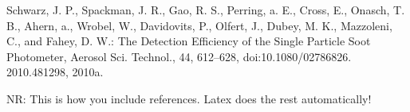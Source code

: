 \documentclass[11pt]{article}
\newcommand{\nrtodo}[1]{{\color{blue} NR: #1}}
\begin{document}
Schwarz, J. P., Spackman, J. R., Gao, R. S., Perring, a. E., Cross, E., Onasch, T. B., Ahern, a., Wrobel, W., Davidovits, P., Olfert, J., Dubey, M. K., Mazzoleni, C., and Fahey, D. W.: The Detection Efficiency of the Single Particle Soot Photometer, Aerosol Sci. Technol., 44, 612–628, doi:10.1080/02786826. 2010.481298, 2010a.

\nrtodo{This is how you include references. Latex does the rest automatically!}








\end{document}
